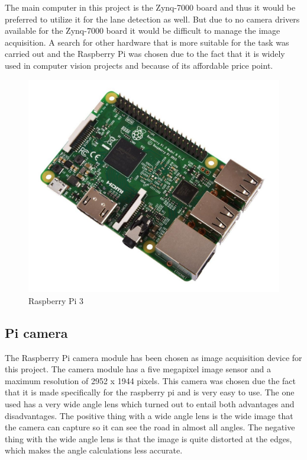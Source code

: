 The main computer in this project is the Zynq-7000 board and thus it would be preferred to utilize it for the lane detection as well. But due to no camera drivers available for the Zynq-7000 board it would be difficult to manage the image acquisition. A search for other hardware that is more suitable for the task was carried out and the Raspberry Pi was chosen due to the fact that it is widely used in computer vision projects and because of its affordable price point.

\begin{figure}[H]
  \includegraphics[scale=0.3]{./img/rpi.jpg}
  \centering
  \caption{Raspberry Pi 3}
  \label{fig:RPI}
\end{figure}

\subsection{Pi camera}
The Raspberry Pi camera module has been chosen as image acquisition device for this project. The camera module has a five megapixel image sensor and a maximum resolution of 2952 x 1944 pixels. This camera was chosen due the fact that it is made specifically for the raspberry pi and is very easy to use. The one used has a very wide angle lens which turned out to entail both advantages and disadvantages. The positive thing with a wide angle lens is the wide image that the camera can capture so it can see the road in almost all angles. The negative thing with the wide angle lens is that the image is quite distorted at the edges, which makes the angle calculations less accurate. 



